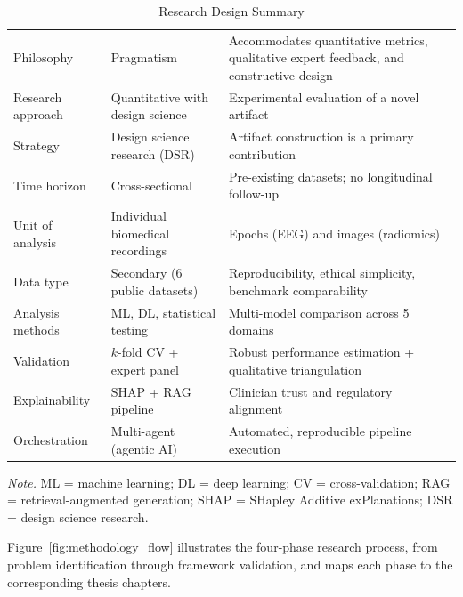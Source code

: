 \begin{table}[H]
\tablestripes
\begin{tabularx}{\textwidth}{L L L}
\toprule
{} &  &  \\
\midrule
Philosophy & Pragmatism & Accommodates quantitative metrics, qualitative expert feedback, and constructive design \\
Research approach & Quantitative with design science & Experimental evaluation of a novel artifact \\
Strategy & Design science research (DSR) & Artifact construction is a primary contribution \\
Time horizon & Cross-sectional & Pre-existing datasets; no longitudinal follow-up \\
Unit of analysis & Individual biomedical recordings & Epochs (EEG) and images (radiomics) \\
Data type & Secondary (6 public datasets) & Reproducibility, ethical simplicity, benchmark comparability \\
Analysis methods & ML, DL, statistical testing & Multi-model comparison across 5 domains \\
Validation & $k$-fold CV + expert panel & Robust performance estimation + qualitative triangulation \\
Explainability & SHAP + RAG pipeline & Clinician trust and regulatory alignment \\
Orchestration & Multi-agent (agentic AI) & Automated, reproducible pipeline execution \\
\bottomrule
\end{tabularx}
\caption{Research Design Summary}
\label{tab:design_summary}
\vspace{0.5em}\noindent\textit{Note.} ML = machine learning; DL = deep learning; CV = cross-validation; RAG = retrieval-augmented generation; SHAP = SHapley Additive exPlanations; DSR = design science research.
\end{table}

Figure~\ref{fig:methodology_flow} illustrates the four-phase research process, from problem identification through framework validation, and maps each phase to the corresponding thesis chapters.

